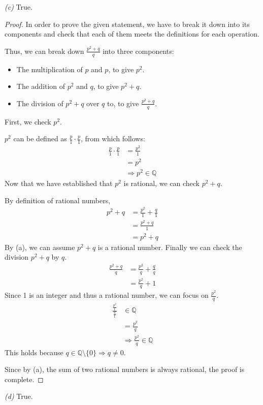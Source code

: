 \documentclass[12pt, letterpaper]{article}
\newcommand{\Q}{\mathbb{Q}}
\begin{document}
\textit{(c)} True.
\begin{proof}
    In order to prove the given statement, we have to break it down into its components
    and check that each of them meets the definitions for each operation.

    Thus, we can break down $\tfrac{p^{2} + q}{q}$ into three components:
    \begin{itemize}
        \item The multiplication of $p$ and $p$, to give $p^{2}$.
        \item The addition of $p^{2}$ and $q$, to give $p^{2} + q$.
        \item The division of $p^{2} + q$ over $q$ to, to give $\tfrac{p^{2} + q}{q}$.
    \end{itemize}
    First, we check $p^{2}$.

    $p^{2}$ can be defined as $\tfrac{p}{1} \cdot \tfrac{p}{1}$, from which follows:
    \begin{align*}
        \frac{p}{1} \cdot \frac{p}{1} & = \frac{p^{2}}{1}\\
        & = p^{2}\\
        & \Rightarrow p^{2} \in \Q
    \end{align*}
    Now that we have established that $p^{2}$ is rational, we can check $p^{2} + q$.
    
    By definition of rational numbers,
    \begin{align*}
        p^{2} + q & = \frac{p^{2}}{1} + \frac{q}{1}\\
        & = \frac{p^{2} + q}{1}\\
        & = p^{2} + q
    \end{align*}
    By (a), we can assume $p^{2} + q$ is a rational number.
    Finally we can check the division $p^{2} + q$ by $q$.
    \begin{align*}
        \frac{p^{2} + q}{q} & = \frac{p^{2}}{q} + \frac{q}{q}\\
        & = \frac{p^{2}}{q} + 1
    \end{align*}
    Since 1 is an integer and thus a rational number, we can focus on $\tfrac{p^{2}}{q}$.
    \begin{align*}
        \frac{\tfrac{p^{2}}{1}}{\tfrac{q}{1}} & \in \Q\\
        & = \frac{p^{2}}{q}\\
        & \Rightarrow \frac{p^{2}}{q} \in \Q
    \end{align*}
    This holds because $q \in \Q \setminus \{0\} \Rightarrow q \neq 0$.
    
    Since by (a), the sum of two rational numbers is always rational, the proof is complete.
\end{proof}
\newpage
\textit{(d)} True.
\end{document}
